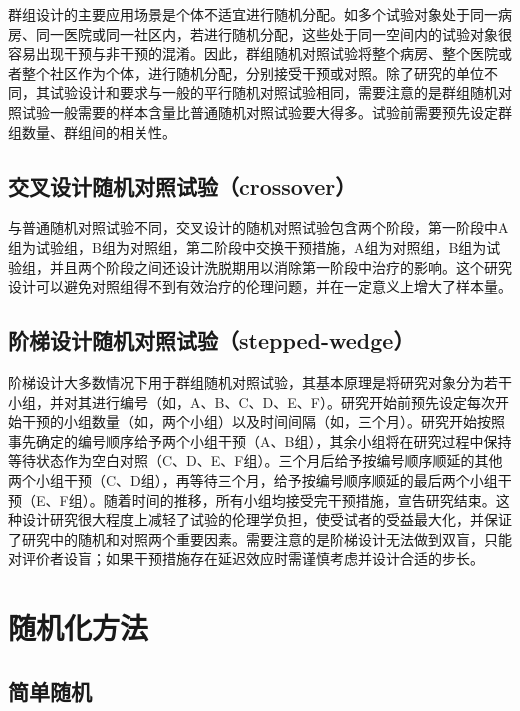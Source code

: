 \documentclass[
  chinese-hans,
  letterpaper,
  DIV=11,
  numbers=noendperiod]{scrreprt}
\begin{document}
群组设计的主要应用场景是个体不适宜进行随机分配。如多个试验对象处于同一病房、同一医院或同一社区内，若进行随机分配，这些处于同一空间内的试验对象很容易出现干预与非干预的混淆。因此，群组随机对照试验将整个病房、整个医院或者整个社区作为个体，进行随机分配，分别接受干预或对照。除了研究的单位不同，其试验设计和要求与一般的平行随机对照试验相同，需要注意的是群组随机对照试验一般需要的样本含量比普通随机对照试验要大得多。试验前需要预先设定群组数量、群组间的相关性。

\subsection{交叉设计随机对照试验（crossover）}\label{ux4ea4ux53c9ux8bbeux8ba1ux968fux673aux5bf9ux7167ux8bd5ux9a8ccrossover}

与普通随机对照试验不同，交叉设计的随机对照试验包含两个阶段，第一阶段中A组为试验组，B组为对照组，第二阶段中交换干预措施，A组为对照组，B组为试验组，并且两个阶段之间还设计洗脱期用以消除第一阶段中治疗的影响。这个研究设计可以避免对照组得不到有效治疗的伦理问题，并在一定意义上增大了样本量。

\subsection{阶梯设计随机对照试验（stepped-wedge）}\label{ux9636ux68afux8bbeux8ba1ux968fux673aux5bf9ux7167ux8bd5ux9a8cstepped-wedge}

阶梯设计大多数情况下用于群组随机对照试验，其基本原理是将研究对象分为若干小组，并对其进行编号（如，A、B、C、D、E、F）。研究开始前预先设定每次开始干预的小组数量（如，两个小组）以及时间间隔（如，三个月）。研究开始按照事先确定的编号顺序给予两个小组干预（A、B组），其余小组将在研究过程中保持等待状态作为空白对照（C、D、E、F组）。三个月后给予按编号顺序顺延的其他两个小组干预（C、D组），再等待三个月，给予按编号顺序顺延的最后两个小组干预（E、F组）。随着时间的推移，所有小组均接受完干预措施，宣告研究结束。这种设计研究很大程度上减轻了试验的伦理学负担，使受试者的受益最大化，并保证了研究中的随机和对照两个重要因素。需要注意的是阶梯设计无法做到双盲，只能对评价者设盲；如果干预措施存在延迟效应时需谨慎考虑并设计合适的步长。

\section{随机化方法}\label{ux968fux673aux5316ux65b9ux6cd5}

\subsection{简单随机}\label{ux7b80ux5355ux968fux673a}
\end{document}
